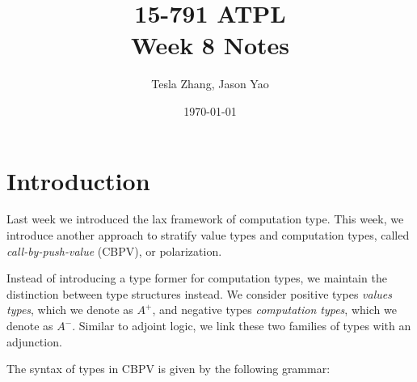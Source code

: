\documentclass[letterpaper]{article}
\title{15-791 ATPL \\ Week 8 Notes}
\author{Tesla Zhang, Jason Yao}
\date{\today}
\begin{document}
\maketitle

\usepackage{newunicodechar}

\section{Introduction}
Last week we introduced the lax framework of computation type.
This week, we introduce another approach to stratify value types and computation types,
called \emph{call-by-push-value} (CBPV), or polarization.

Instead of introducing a type former for computation types,
we maintain the distinction between type structures instead.
We consider positive types \emph{values types}, which we denote as $A^+$,
and negative types \emph{computation types}, which we denote as $A^-$.
Similar to adjoint logic, we link these two families of types with an adjunction.

The syntax of types in CBPV is given by the following grammar:
\end{document}
